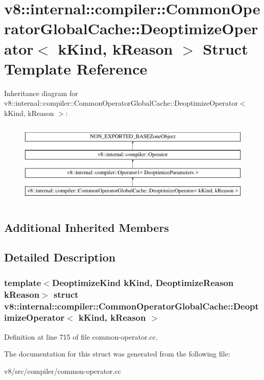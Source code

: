 \hypertarget{structv8_1_1internal_1_1compiler_1_1CommonOperatorGlobalCache_1_1DeoptimizeOperator}{}\section{v8\+:\+:internal\+:\+:compiler\+:\+:Common\+Operator\+Global\+Cache\+:\+:Deoptimize\+Operator$<$ k\+Kind, k\+Reason $>$ Struct Template Reference}
\label{structv8_1_1internal_1_1compiler_1_1CommonOperatorGlobalCache_1_1DeoptimizeOperator}
Inheritance diagram for v8\+:\+:internal\+:\+:compiler\+:\+:Common\+Operator\+Global\+Cache\+:\+:Deoptimize\+Operator$<$ k\+Kind, k\+Reason $>$\+:\begin{figure}[H]
\begin{center}
\leavevmode
\includegraphics[height=4.000000cm]{structv8_1_1internal_1_1compiler_1_1CommonOperatorGlobalCache_1_1DeoptimizeOperator}
\end{center}
\end{figure}
\subsection*{Additional Inherited Members}


\subsection{Detailed Description}
\subsubsection*{template$<$Deoptimize\+Kind k\+Kind, Deoptimize\+Reason k\+Reason$>$\newline
struct v8\+::internal\+::compiler\+::\+Common\+Operator\+Global\+Cache\+::\+Deoptimize\+Operator$<$ k\+Kind, k\+Reason $>$}



Definition at line 715 of file common-\/operator.\+cc.



The documentation for this struct was generated from the following file\+:\begin{DoxyCompactItemize}
\item 
v8/src/compiler/common-\/operator.\+cc\end{DoxyCompactItemize}

